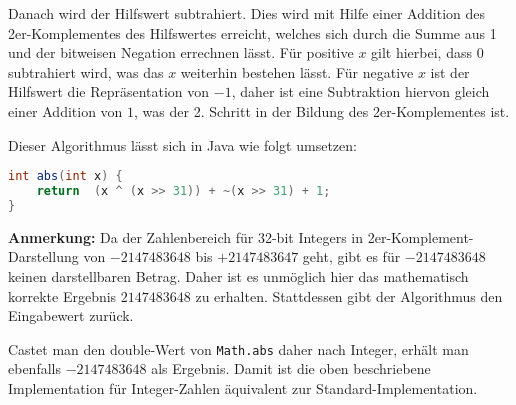 \documentclass[a4paper,10pt]{scrartcl}
\begin{document}
\begin{enumerate}
\begin{enumerate}
                Danach wird der Hilfswert subtrahiert. Dies wird mit Hilfe einer Addition des 2er-Komplementes des
                Hilfswertes erreicht, welches sich durch die Summe aus 1 und der bitweisen Negation errechnen lässt.
                Für positive $x$ gilt hierbei, dass $0$ subtrahiert wird, was das $x$ weiterhin bestehen lässt. Für
                negative $x$ ist der Hilfswert die Repräsentation von $-1$, daher ist eine Subtraktion hiervon gleich
                einer Addition von $1$, was der 2. Schritt in der Bildung des 2er-Komplementes ist.

                Dieser Algorithmus lässt sich in Java wie folgt umsetzen:

            \begin{lstlisting}[language=java]
int abs(int x) {
    return  (x ^ (x >> 31)) + ~(x >> 31) + 1;
}
            \end{lstlisting}

                \textbf{Anmerkung:} Da der Zahlenbereich für 32-bit Integers in 2er-Komplement-Darstellung von
                $-2147483648$ bis $+2147483647$ geht, gibt es für $-2147483648$ keinen darstellbaren Betrag. Daher
                ist es unmöglich hier das mathematisch korrekte Ergebnis $2147483648$ zu erhalten. Stattdessen
                gibt der Algorithmus den Eingabewert zurück.

                Castet man den double-Wert von \lstinline|Math.abs| daher nach Integer, erhält
                man ebenfalls $-2147483648$ als Ergebnis. Damit ist die oben beschriebene Implementation
                für Integer-Zahlen äquivalent zur Standard-Implementation.
        \end{enumerate}
\end{enumerate}
\end{document}

